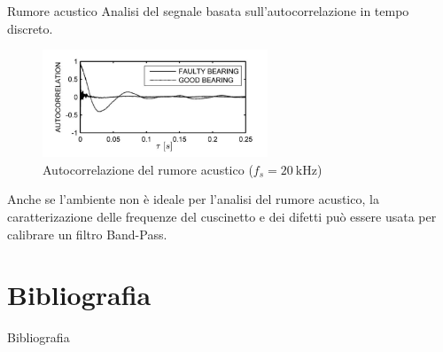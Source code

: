 \documentclass{beamer}
\begin{document}
\begin{frame}{Rumore acustico}
    Analisi del segnale basata sull'autocorrelazione in tempo discreto.

    \begin{figure}
        \centering
        \includegraphics[width=0.6\textwidth]{Figures/Acoustic.png}
        \caption{Autocorrelazione del rumore acustico ($f_s = \SI{20}{\kilo \hertz}$)}
        \label{fig:acoustic}
    \end{figure}

    Anche se l'ambiente non è ideale per l'analisi del rumore acustico, la caratterizazione delle frequenze del cuscinetto e dei difetti può essere usata per calibrare un filtro Band-Pass.

\end{frame}

\section*{Bibliografia}

\begin{frame}[allowframebreaks]{Bibliografia}
    \printbibliography
\end{frame}
\end{document}
